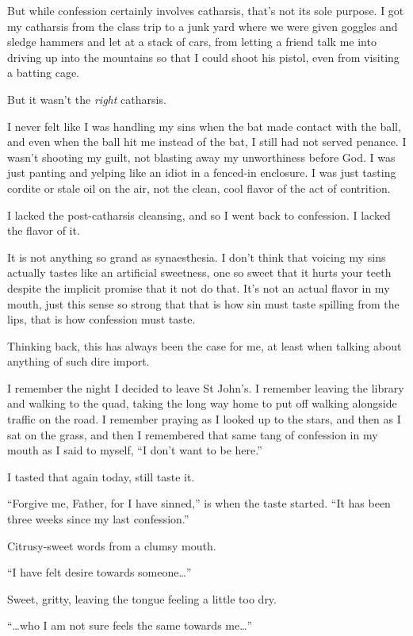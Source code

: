 But while confession certainly involves catharsis, that's not its sole purpose. I got my catharsis from the class trip to a junk yard where we were given goggles and sledge hammers and let at a stack of cars, from letting a friend talk me into driving up into the mountains so that I could shoot his pistol, even from visiting a batting cage.

But it wasn't the \emph{right} catharsis.

I never felt like I was handling my sins when the bat made contact with the ball, and even when the ball hit me instead of the bat, I still had not served penance. I wasn't shooting my guilt, not blasting away my unworthiness before God. I was just panting and yelping like an idiot in a fenced-in enclosure. I was just tasting cordite or stale oil on the air, not the clean, cool flavor of the act of contrition.

I lacked the post-catharsis cleansing, and so I went back to confession. I lacked the flavor of it.

It is not anything so grand as synaesthesia. I don't think that voicing my sins actually tastes like an artificial sweetness, one so sweet that it hurts your teeth despite the implicit promise that it not do that. It's not an actual flavor in my mouth, just this sense so strong that that is how sin must taste spilling from the lips, that is how confession must taste.

Thinking back, this has always been the case for me, at least when talking about anything of such dire import.

I remember the night I decided to leave St John's. I remember leaving the library and walking to the quad, taking the long way home to put off walking alongside traffic on the road. I remember praying as I looked up to the stars, and then as I sat on the grass, and then I remembered that same tang of confession in my mouth as I said to myself, ``I don't want to be here.''

I tasted that again today, still taste it.

``Forgive me, Father, for I have sinned,'' is when the taste started. ``It has been three weeks since my last confession.''

Citrusy-sweet words from a clumsy mouth.

``I have felt desire towards someone\ldots{}''

Sweet, gritty, leaving the tongue feeling a little too dry.

``\ldots who I am not sure feels the same towards me\ldots{}''


